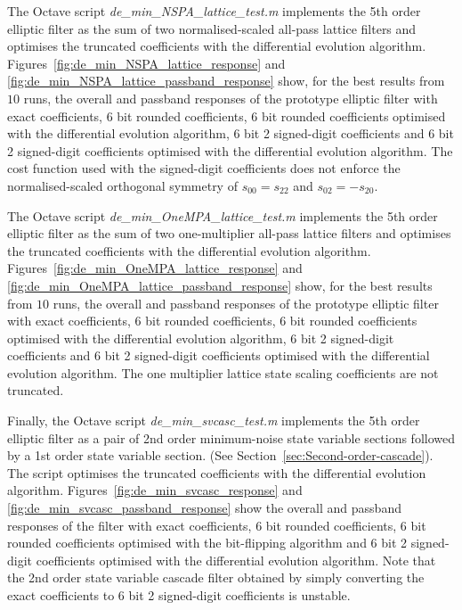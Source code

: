 \documentclass[a4paper,twoside,10pt,english]{report}
\begin{document}
The Octave script \emph{de\_min\_NSPA\_lattice\_test.m} implements the 5th order 
elliptic filter as the sum of two normalised-scaled all-pass lattice filters and 
optimises the truncated coefficients with the differential evolution algorithm. 
Figures~\ref{fig:de_min_NSPA_lattice_response} and
\ref{fig:de_min_NSPA_lattice_passband_response} show, for the best results from
$10$ runs, the overall and passband responses of the prototype elliptic filter 
with exact coefficients, 6 bit rounded coefficients, 6 bit rounded coefficients 
optimised with the differential evolution algorithm, 6 bit 2 signed-digit 
coefficients and 6 bit 2 signed-digit coefficients optimised with the 
differential evolution algorithm. The cost function used with the signed-digit 
coefficients does not enforce the normalised-scaled orthogonal symmetry of 
$s_{00}=s_{22}$ and $s_{02}=-s_{20}$.

The Octave script \emph{de\_min\_OneMPA\_lattice\_test.m} implements the 5th 
order elliptic filter as the sum of two one-multiplier all-pass lattice filters
and optimises the truncated coefficients with the differential evolution 
algorithm. Figures~\ref{fig:de_min_OneMPA_lattice_response} and
\ref{fig:de_min_OneMPA_lattice_passband_response} show, for the best results from
$10$ runs, the overall and passband responses of the prototype elliptic filter 
with exact coefficients, 6 bit rounded coefficients, 6 bit rounded coefficients 
optimised with the differential evolution algorithm, 6 bit 2 signed-digit 
coefficients and 6 bit 2 signed-digit coefficients optimised with the 
differential evolution algorithm. The one multiplier lattice state scaling
coefficients are not truncated. 

Finally, the Octave script \emph{de\_min\_svcasc\_test.m} implements the 5th
order elliptic filter as a pair of 2nd order minimum-noise state variable 
sections followed by a 1st order state variable section. (See 
Section~\ref{sec:Second-order-cascade}). The script optimises the truncated 
coefficients with the differential evolution algorithm. 
Figures~\ref{fig:de_min_svcasc_response} and 
\ref{fig:de_min_svcasc_passband_response} show the overall and passband
responses of the filter with exact coefficients, 6 bit rounded
coefficients, 6 bit rounded coefficients optimised with the bit-flipping 
algorithm and 6 bit 2 signed-digit coefficients optimised with the differential
evolution algorithm. Note that the 2nd order
state variable cascade filter obtained by simply converting the exact 
coefficients to 6 bit 2 signed-digit coefficients is unstable.
\end{document}
